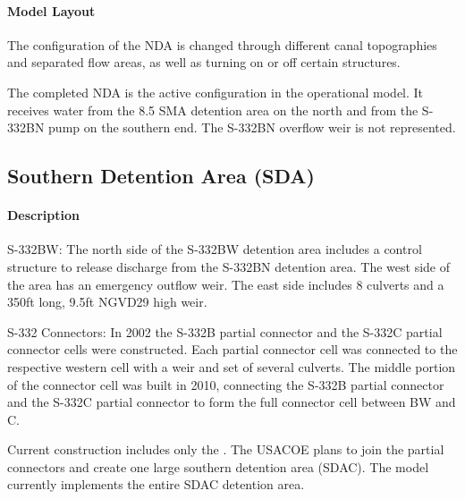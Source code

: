 \paragraph{Model Layout}

The configuration of the NDA is changed through different canal topographies and separated flow areas, as well as turning on or off certain structures.

The completed NDA is the active configuration in the operational model. It receives water from the 8.5 SMA detention area on the north and from the S-332BN pump on the southern end. The S-332BN overflow weir is not represented.



\clearpage
\subsection{Southern Detention Area (SDA)}

\paragraph{Description}

S-332BW: The north side of the S-332BW detention area includes a control structure to release discharge from the S-332BN detention area. The west side of the area has an emergency outflow weir. The east side includes 8 culverts and a 350ft long, 9.5ft NGVD29 high weir.

S-332 Connectors: In 2002 the S-332B partial connector and the S-332C partial connector cells were constructed. Each partial connector cell was connected to the respective western cell with a weir and set of several culverts. The middle portion of the connector cell was built in 2010, connecting the S-332B partial connector and the S-332C partial connector to form the full connector cell between BW and C.

Current construction includes only the . The USACOE plans to join the partial connectors and create one large southern detention area (SDAC). The model currently implements the entire SDAC detention area.



